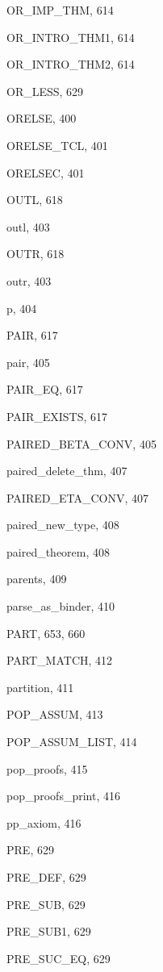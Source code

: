 \begin{theindex}
  \item {\ptt OR\_IMP\_THM}, 614
  \item {\ptt OR\_INTRO\_THM1}, 614
  \item {\ptt OR\_INTRO\_THM2}, 614
  \item {\ptt OR\_LESS}, 629
  \item {\ptt ORELSE}, 400
  \item {\ptt ORELSE\_TCL}, 401
  \item {\ptt ORELSEC}, 401
  \item {\ptt OUTL}, 618
  \item {\ptt outl}, 403
  \item {\ptt OUTR}, 618
  \item {\ptt outr}, 403

  \indexspace

  \item {\ptt p}, 404
  \item {\ptt PAIR}, 617
  \item {\ptt pair}, 405
  \item {\ptt PAIR\_EQ}, 617
  \item {\ptt PAIR\_EXISTS}, 617
  \item {\ptt PAIRED\_BETA\_CONV}, 405
  \item {\ptt paired\_delete\_thm}, 407
  \item {\ptt PAIRED\_ETA\_CONV}, 407
  \item {\ptt paired\_new\_type}, 408
  \item {\ptt paired\_theorem}, 408
  \item {\ptt parents}, 409
  \item {\ptt parse\_as\_binder}, 410
  \item {\ptt PART}, 653, 660
  \item {\ptt PART\_MATCH}, 412
  \item {\ptt partition}, 411
  \item {\ptt POP\_ASSUM}, 413
  \item {\ptt POP\_ASSUM\_LIST}, 414
  \item {\ptt pop\_proofs}, 415
  \item {\ptt pop\_proofs\_print}, 416
  \item {\ptt pp\_axiom}, 416
  \item {\ptt PRE}, 629
  \item {\ptt PRE\_DEF}, 629
  \item {\ptt PRE\_SUB}, 629
  \item {\ptt PRE\_SUB1}, 629
  \item {\ptt PRE\_SUC\_EQ}, 629

\end{theindex}
